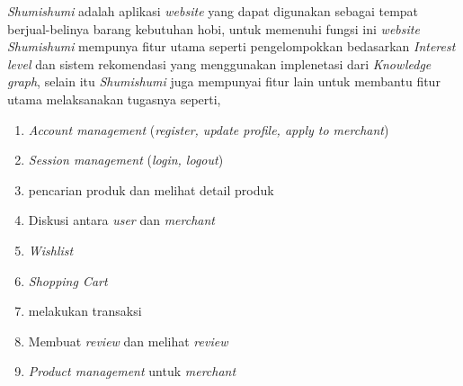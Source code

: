 \documentclass[a4paper]{article}
\begin{document}
\textit{Shumishumi} adalah aplikasi \textit{website} yang dapat digunakan sebagai tempat berjual-belinya barang kebutuhan hobi, untuk memenuhi fungsi ini \textit{website Shumishumi} mempunya fitur utama seperti pengelompokkan bedasarkan \textit{Interest level} dan sistem rekomendasi yang menggunakan implenetasi dari \textit{Knowledge graph}, selain itu \textit{Shumishumi} juga mempunyai fitur lain untuk membantu fitur utama melaksanakan tugasnya seperti,
\begin{enumerate}
    \item \textit{Account management} (\textit{register, update profile, apply to merchant})
    \item \textit{Session management} (\textit{login, logout})
    \item pencarian produk dan melihat detail produk
    \item Diskusi antara \textit{user} dan \textit{merchant}
    \item \textit{Wishlist}
    \item \textit{Shopping Cart}
    \item melakukan transaksi
    \item Membuat \textit{review} dan melihat \textit{review}
    \item \textit{Product management} untuk \textit{merchant}
\end{enumerate}
\end{document}
